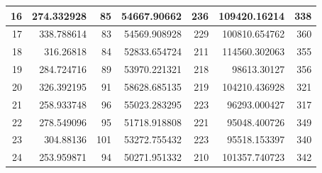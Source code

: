 \begin{table}
\begin{adjustwidth}{}{}
{{\begin{tabular}{|r|r|r|r|r|r|r|}
\hline
16                                         & 274.332928                   & 85                                    & 54667.90662                    & 236                                   & 109420.16214                 & 338                                    \\ 
\hline
17                                         & 338.788614                   & 83                                    & 54569.908928                   & 229                                   & 100810.654762                & 360                                    \\ 
\hline
18                                         & 316.26818                    & 84                                    & 52833.654724                   & 211                                   & 114560.302063                & 355                                    \\ 
\hline
19                                         & 284.724716                   & 89                                    & 53970.221321                   & 218                                   & 98613.30127                  & 356                                    \\ 
\hline
20                                         & 326.392195                   & 91                                    & 58628.685135                   & 219                                   & 104210.436928                & 321                                    \\ 
\hline
21                                         & 258.933748                   & 96                                    & 55023.283295                   & 223                                   & 96293.000427                 & 317                                    \\ 
\hline
22                                         & 278.549096                   & 95                                    & 51718.918808                   & 221                                   & 95048.400726                 & 349                                    \\ 
\hline
23                                         & 304.88136                    & 101                                   & 53272.755432                   & 223                                   & 95518.153397                 & 340                                    \\ 
\hline
24                                         & 253.959871                   & 94                                    & 50271.951332                   & 210                                   & 101357.740723                & 342                                    \\ 

\end{tabular}}}
\end{adjustwidth}
\end{table}
